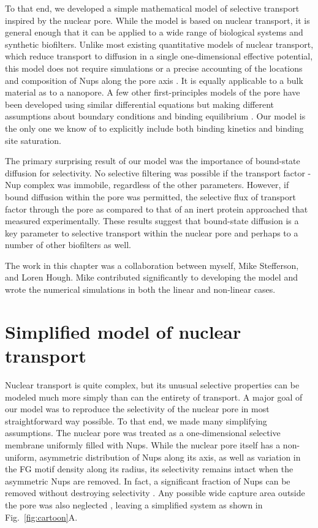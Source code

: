 To that end, we developed a simple mathematical model of selective transport inspired by the nuclear pore.  While the model is based on nuclear transport, it is general enough that it can be applied to a wide range of biological systems and synthetic biofilters.  Unlike most existing quantitative models of nuclear transport, which reduce transport to diffusion in a single one-dimensional effective potential, this model does not require simulations or a precise accounting of the locations and composition of Nups along the pore axis \cite{pulupa17, vovk16,tagliazucchi13, tu13, timney16}.  It is equally applicable to a bulk material as to a nanopore.  A few other first-principles models of the pore have been developed using similar differential equations but making different assumptions about boundary conditions and binding equilibrium \cite{zilman07,yang18}.  Our model is the only one we know of to explicitly include both binding kinetics and binding site saturation.

The primary surprising result of our model was the importance of bound-state diffusion for selectivity.  No selective filtering was possible if the transport factor - Nup complex was immobile, regardless of the other parameters.  However, if bound diffusion within the pore was permitted, the selective flux of transport factor through the pore as compared to that of an inert protein approached that measured experimentally.  These results suggest that bound-state diffusion is a key parameter to selective transport within the nuclear pore and perhaps to a number of other biofilters as well.

The work in this chapter was a collaboration between myself, Mike Stefferson, and Loren Hough.  Mike contributed significantly to developing the model and wrote the numerical simulations in both the linear and non-linear cases.

\section{Simplified model of nuclear transport}
\label{sec:model}

Nuclear transport is quite complex, but its unusual selective properties can be modeled much more simply than can the entirety of transport.  A major goal of our model was to reproduce the selectivity of the nuclear pore in most straightforward way possible.  To that end, we made many simplifying assumptions.  The nuclear pore was treated as a one-dimensional selective membrane uniformly filled with Nups.  While the nuclear pore itself has a non-uniform, asymmetric distribution of Nups along its axis, as well as variation in the FG motif density along its radius, its selectivity remains intact when the asymmetric Nups are removed.  In fact, a significant fraction of Nups can be removed without destroying selectivity \cite{strawn04, zeitler04,kowalczyk11, jovanovic-talisman09}.  Any possible wide capture area outside the pore was also neglected \cite{pagliara14}, leaving a simplified system as shown in Fig.~\ref{fig:cartoon}A.

